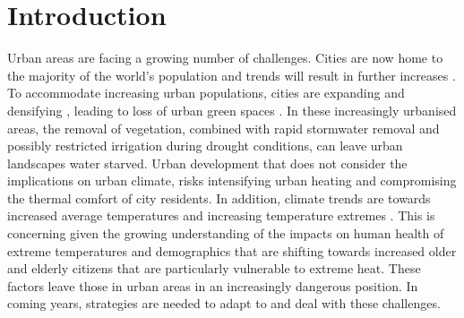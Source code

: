 \documentclass[final,3p,times,authoryear]{elsarticle}
\begin{document}
\begin{table}[!t]   
\begin{framed}
\printnomenclature
%
\end{framed}
\end{table}





\section{Introduction}\label{sec:introduction}
Urban areas are facing a growing number of challenges. Cities are now home to the majority of the world's population and trends will result in further increases \citep{UNDESA2015,WHO2016}. To accommodate increasing urban populations, cities are expanding \citep{Seto2011} and densifying \citep{Byrne2016,Ruth2016,DSE2002}, leading to loss of urban green spaces \citep{Hamin2009,Coutts2007}. In these increasingly urbanised areas, the removal of vegetation, combined with rapid stormwater removal and possibly restricted irrigation during drought conditions, can leave urban landscapes water starved. Urban development that does not consider the implications on urban climate, risks intensifying urban heating and compromising the thermal comfort of city residents. In addition, climate trends are towards increased average temperatures and increasing temperature extremes \citep{Alexander2009,IPCC2013a}. This is concerning given the growing understanding of the impacts on human health of extreme temperatures \citep{Katsouyanni1993,Nicholls2008,Loughnan2010} and demographics that are shifting towards increased older and elderly citizens \citep{Cohen2003,FIFARS2016} that are particularly vulnerable to extreme heat. These factors leave those in urban areas in an increasingly dangerous position. In coming years, strategies are needed to adapt to and deal with these challenges.
\end{document}
